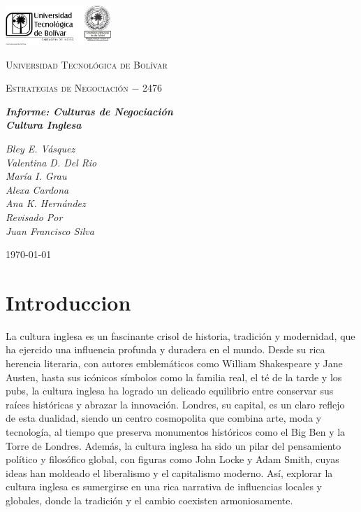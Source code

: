 \documentclass[letterpaper, 12pt]{article}
\begin{document}
\begin{titlepage}
      \centering
      \includegraphics[width=0.3\textwidth]{Images/logo_utb.png}\par\vspace{1cm}
      {\scshape\LARGE Universidad Tecnológica de Bolívar \par}
      \vspace{.5cm}

      {\scshape\Large Estrategias de Negociación $-$ 2476 \par}
      \vspace{.2cm}

      \vspace{.5cm}
      \slshape {\Large \bfseries{}Informe: Culturas de Negociación\\}
      \slshape {\small \bfseries{}Cultura Inglesa}
      \vspace{1cm}

      \slshape {\itshape{} Bley E. Vásquez \\}
      \slshape {\itshape{} Valentina D. Del Rio \\}
      \slshape {\itshape{} María I. Grau \\}
      \slshape {\itshape{} Alexa Cardona  \\}
      \slshape {\itshape{} Ana K. Hernández \\}
      \vfill
      Revisado Por \\
      Juan Francisco Silva\\
      {\large \today\par}
\end{titlepage}


\section*{Introduccion}

La cultura inglesa es un fascinante crisol de historia, tradición y modernidad,
que ha ejercido una influencia profunda y duradera en el mundo. Desde su rica
herencia literaria, con autores emblemáticos como William Shakespeare y Jane
Austen, hasta sus icónicos símbolos como la familia real, el té de la tarde y
los pubs, la cultura inglesa ha logrado un delicado equilibrio entre conservar
sus raíces históricas y abrazar la innovación. Londres, su capital, es un claro
reflejo de esta dualidad, siendo un centro cosmopolita que combina arte, moda y
tecnología, al tiempo que preserva monumentos históricos como el Big Ben y la
Torre de Londres. Además, la cultura inglesa ha sido un pilar del pensamiento
político y filosófico global, con figuras como John Locke y Adam Smith, cuyas
ideas han moldeado el liberalismo y el capitalismo moderno. Así, explorar la
cultura inglesa es sumergirse en una rica narrativa de influencias locales y
globales, donde la tradición y el cambio coexisten armoniosamente.
\end{document}
